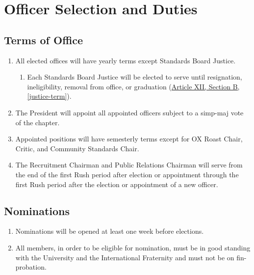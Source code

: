 \chapter{Officer Selection and Duties}

\section{Terms of Office}
	\begin{enumerate}
		\item All elected offices will have yearly terms except Standards Board Justice.
			\begin{enumerate}

				\item Each Standards Board Justice will be elected to serve until resignation, ineligibility, removal from office, or graduation (\hyperref[justice-term]{Article XII, Section B, \autoref*{justice-term}}).
			\end{enumerate}
		\item The President will appoint all appointed officers subject to a \gls{simp-maj} vote of the chapter. \label{appointed-approval}

		\item Appointed positions will have semesterly terms except for OX Roast Chair, Critic, and Community Standards Chair.

		\item The Recruitment Chairman and Public Relations Chairman will serve from the end of the first Rush period after election or appointment through the first Rush period after the election or appointment of a new officer.
	\end{enumerate}

\section{Nominations}
	\begin{enumerate}
		\item Nominations will be opened at least one week before elections.
		\item All members, in order to be eligible for nomination, must be in good standing with the University and the International Fraternity and must not be on \gls{fin-probation}.
	\end{enumerate}


